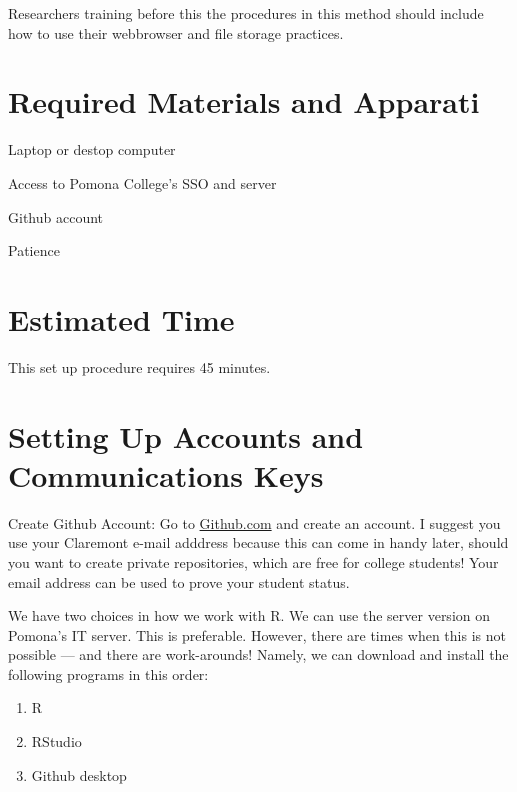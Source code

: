 \documentclass[12pt]{../SOP3_beta}
\begin{document}
\NP Researchers training before this the procedures in this method should include how to use their webbrowser and file storage practices. 


\section{Required Materials and Apparati}

\NP Laptop or destop computer

\NP Access to Pomona College's SSO and server

\NP Github account

\NP Patience


\section{Estimated Time}

\NP This set up procedure requires 45 minutes.



\section{Setting Up Accounts and Communications Keys}

\NP Create Github Account: Go to \href{http:\\github.com}{Github.com} and create an account. I suggest you use your Claremont e-mail adddress because this can come in handy later, should you want to create private repositories, which are free for college students! Your email address can be used to prove your student status.
  
\NP We have two choices in how we work with R. We can use the server version on Pomona's IT server. This is preferable. However, there are times when this is not possible --- and there are work-arounds!  Namely, we can download and install the following programs in this order: 

\begin{enumerate}
  \item R 
  \item RStudio
  \item Github desktop
\end{enumerate}
\end{document}
